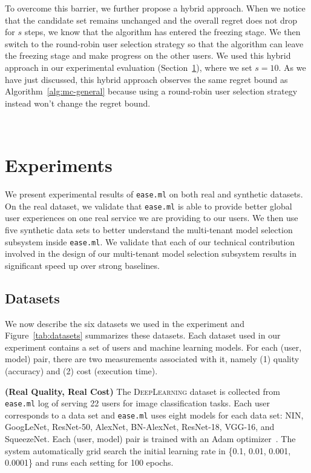 \documentclass[letterpaper]{vldb}
\newcommand{\eml}{\texttt{ease.ml}\xspace}
\begin{document}
To overcome this barrier, we further propose a hybrid approach.
When we notice that the candidate set remains unchanged and the overall regret does not drop for $s$ steps,
we know that the algorithm has entered the freezing stage.
We then switch to the round-robin user selection strategy so that the algorithm can leave the freezing stage and make progress on the other users.
We used this hybrid approach in our experimental evaluation (Section~\ref{sec:experiments}), where we set $s=10$.
As we have just discussed, this hybrid approach observes the same regret bound as Algorithm~\ref{alg:mc-general} because using a round-robin user selection strategy instead won't change the regret bound.



\newpage
~
\newpage

\section{Experiments}\label{sec:experiments}

We present experimental results of 
\eml on both real and synthetic datasets.
On the real dataset, we validate that
\eml is able to provide
better global user experiences on one
real service we are providing to our users. 
We then use five synthetic data sets
to better understand the multi-tenant model
selection subsystem inside \eml. We validate
that each of our technical contribution 
involved in the design of our 
multi-tenant model selection subsystem
results in significant speed up
over strong baselines.

\subsection{Datasets}

We now describe the six datasets we used
in the experiment and Figure~\ref{tab:datasets} summarizes these datasets.
Each dataset used in our experiment 
contains a set of users and machine
learning models. For each (user, model)
pair, there are two measurements
associated with it, namely (1) quality
(accuracy) and (2) cost
(execution time).

\vspace{0.5em}
\noindent
{\bf (Real Quality, Real Cost)} The 
\textsc{DeepLearning} dataset is collected
from \eml log of serving 22 users 
for image classification tasks. Each
user corresponds to a data set and
\eml uses eight models for
each data set:
NIN, GoogLeNet, ResNet-50, AlexNet, BN-AlexNet, ResNet-18, VGG-16, and SqueezeNet.
Each (user, model) pair is trained with
an Adam optimizer~\cite{XX}. The
system automatically grid search 
the initial learning rate in
\{0.1, 0.01, 0.001, 0.0001\} and
runs each setting for 100 epochs.
\end{document}
